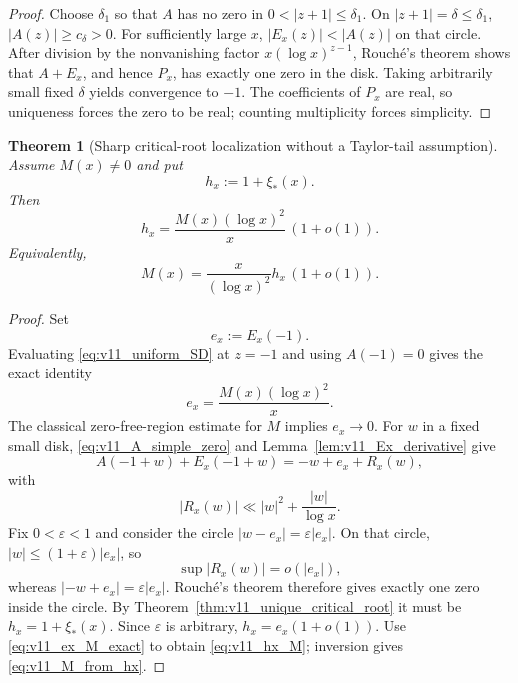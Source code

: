\documentclass[11pt]{amsart}
\numberwithin{equation}{section}
\theoremstyle{plain}
\newtheorem{theorem}{Theorem}[section]
\theoremstyle{definition}
\theoremstyle{remark}
\begin{document}
\begin{proof}
Choose \(\delta_1\) so that \(A\) has no zero in
\(0<|z+1|\le\delta_1\).  On \(|z+1|=\delta\le\delta_1\),
\(|A(z)|\ge c_\delta>0\).  For sufficiently large \(x\),
\(|E_x(z)|<|A(z)|\) on that circle.  After division by the nonvanishing
factor \(x(\log x)^{z-1}\), Rouch\'e's theorem shows that \(A+E_x\), and
hence \(P_x\), has exactly one zero in the disk.  Taking arbitrarily small
fixed \(\delta\) yields convergence to \(-1\).  The coefficients of \(P_x\)
are real, so uniqueness forces the zero to be real; counting multiplicity
forces simplicity.
\end{proof}

\begin{theorem}[Sharp critical-root localization without a Taylor-tail assumption]
\label{thm:v11_root_M_localization}
Assume \(M(x)\ne0\) and put
\begin{equation}
h_x:=1+\xi_*(x).
\label{eq:v11_hx}
\end{equation}
Then
\begin{equation}
\boxed{
 h_x
 =\frac{M(x)(\log x)^2}{x}\,(1+o(1)).}
\label{eq:v11_hx_M}
\end{equation}
Equivalently,
\begin{equation}
\boxed{
 M(x)
 =\frac{x}{(\log x)^2}h_x\,(1+o(1)).}
\label{eq:v11_M_from_hx}
\end{equation}
\end{theorem}

\begin{proof}
Set
\begin{equation}
e_x:=E_x(-1).
\label{eq:v11_ex}
\end{equation}
Evaluating \eqref{eq:v11_uniform_SD} at \(z=-1\) and using
\(A(-1)=0\) gives the exact identity
\begin{equation}
e_x=\frac{M(x)(\log x)^2}{x}.
\label{eq:v11_ex_M_exact}
\end{equation}
The classical zero-free-region estimate for \(M\) implies \(e_x\to0\).
For \(w\) in a fixed small disk, \eqref{eq:v11_A_simple_zero} and
Lemma~\ref{lem:v11_Ex_derivative} give
\begin{equation}
A(-1+w)+E_x(-1+w)
=-w+e_x+R_x(w),
\label{eq:v11_local_root_equation}
\end{equation}
with
\begin{equation}
|R_x(w)|
\ll |w|^2+\frac{|w|}{\log x}.
\label{eq:v11_local_root_remainder}
\end{equation}
Fix \(0<\varepsilon<1\) and consider the circle
\(|w-e_x|=\varepsilon|e_x|\).  On that circle,
\(|w|\le(1+\varepsilon)|e_x|\), so
\begin{equation}
\sup |R_x(w)|
=o(|e_x|),
\label{eq:v11_Rouche_small_remainder}
\end{equation}
whereas \(|-w+e_x|=\varepsilon|e_x|\).  Rouch\'e's theorem therefore gives
exactly one zero inside the circle.  By
Theorem~\ref{thm:v11_unique_critical_root} it must be \(h_x=1+\xi_*(x)\).
Since \(\varepsilon\) is arbitrary,
\(h_x=e_x(1+o(1))\).  Use \eqref{eq:v11_ex_M_exact} to obtain
\eqref{eq:v11_hx_M}; inversion gives \eqref{eq:v11_M_from_hx}.
\end{proof}
\end{document}
